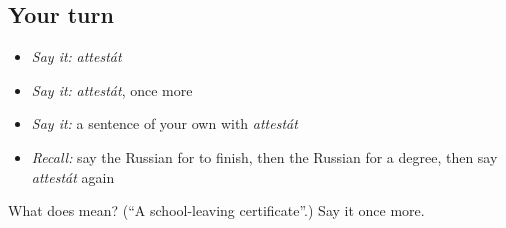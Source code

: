 \subsection*{Your turn}
\begin{itemize}
\raggedright
  \item \emph{Say it:} \emph{attestát}
  \item \emph{Say it:} \emph{attestát}, once more
  \item \emph{Say it:} a sentence of your own with \emph{attestát}
  \item \emph{Recall:} say the Russian for to finish, then the Russian for a degree, then say \emph{attestát} again
\end{itemize}

\begin{tcolorbox}[breakable,colback=teal!4,colframe=teal!35!black,title={Before you move on}]
What does  mean? (\textquotedblleft{}A school-leaving certificate\textquotedblright{}.) Say it once more.
\end{tcolorbox}
